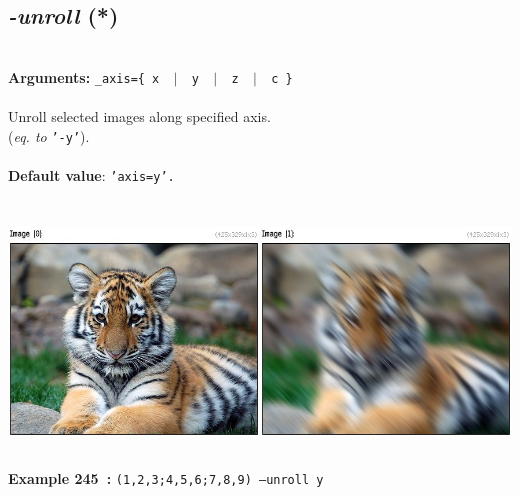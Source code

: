 \documentclass[a4paper,11pt,twoside]{book}
\begin{document}
\subsection{\emph{-unroll} (*)}\vspace*{-0.5em}
~\\\textbf{Arguments: } 
{\small \texttt{\_axis=\{ x ~$|$~ y ~$|$~ z ~$|$~ c \}}}\\~\\
Unroll selected images along specified axis.
~\\(\emph{eq. to} {\small \texttt{'-y'}}).
~\\~\\\textbf{Default value}: {\small \texttt{'axis=y'.}}
\begin{center}\includegraphics[keepaspectratio=true,height=7cm,width=\textwidth]{img/gmic_def245.jpg}\\
{\footnotesize \textbf{Example 245~:} \texttt{(1,2,3;4,5,6;7,8,9) --unroll y}}
\end{center}
\end{document}
